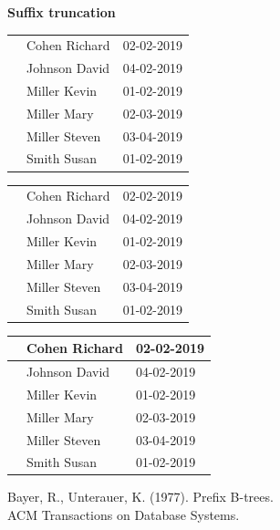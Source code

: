 \documentclass[usenames,dvipsnames, 18pt, compress, aspectratio=169]{beamer}
\begin{document}
\begin{frame}[fragile]{}
    \frametitle{}

    \begin{center}
    \textbf{Suffix truncation}
    \vspace{1cm}

    \begin{overprint}[8cm]
        \begin{tabular}{lll}
            & Cohen Richard & 02-02-2019 \\
            & Johnson David & 04-02-2019 \\
            & Miller Kevin & 01-02-2019 \\
            & Miller Mary & 02-03-2019 \\
            & Miller Steven & 03-04-2019 \\
            & Smith Susan & 01-02-2019 \\
        \end{tabular}

        \begin{tabular}{lll}
            & Cohen Richard & 02-02-2019 \\
            & Johnson David & 04-02-2019 \\
            & Miller Kevin & 01-02-2019 \\
            \hline
            & \colorbox{BurntOrange}{Miller M}ary & 02-03-2019 \\
            & Miller Steven & 03-04-2019 \\
            & Smith Susan & 01-02-2019 \\
        \end{tabular}

        \begin{tabular}{lll}
            & Cohen Richard & 02-02-2019 \\
            \hline
            & \colorbox{BurntOrange}{J}ohnson David & 04-02-2019 \\
            & Miller Kevin & 01-02-2019 \\
            & Miller Mary & 02-03-2019 \\
            & Miller Steven & 03-04-2019 \\
            & Smith Susan & 01-02-2019 \\
        \end{tabular}

    \end{overprint}

    \linespread{0.5}
    \vspace{0.5cm}
    \color{black}\fontsize{6pt}{0}\selectfont
        Bayer, R., Unterauer, K. (1977). Prefix B-trees. \\
        ACM Transactions on Database Systems.
    \linespread{1.5}

    \end{center}
\end{frame}
\end{document}
